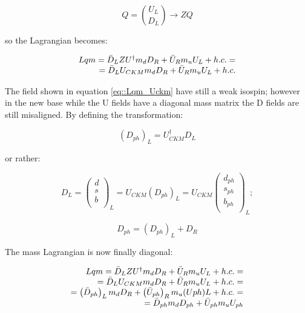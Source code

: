 \begin{equation}
Q = \binom{U_{L}}{D_{L}} \longrightarrow ZQ
\end{equation}

so the Lagrangian becomes:

\begin{equation}
\begin{array}{r c l}
Lqm = \bar{D}_{L}ZU^{\dagger}m_{d}D_{R} + \bar{U}_{R}m_{u}U_{L} + h.c. = \\
= \bar{D}_{L}U_{CKM}m_{d}D_{R} + \bar{U}_{R}m_{u}U_{L} + h.c.
\label{eq::Lqm_Uckm}
\end{array}
\end{equation}

The field shown in equation \ref{eq::Lqm_Uckm} have still a weak isospin; however in the new base while the U fields have a diagonal mass matrix the D fields are still misaligned. By defining the transformation:

\begin{equation}
\left(D_{ph}\right)_{L} = U^{\dagger}_{CKM}D_{L}
\end{equation}

or rather:

\begin{equation}
D_{L} = 
\begin{pmatrix}
d  \\
s  \\
b \\
\end{pmatrix}
_{L} =
U_{CKM}\left(D_{ph}\right)_{L} = U_{CKM}
\begin{pmatrix}
d_{ph}  \\
s_{ph}  \\
b_{ph} \\
\end{pmatrix}
_{L} ;
\end{equation}

\begin{equation}
D_{ph} = \left(D_{ph}\right)_{L} + D_{R}
\end{equation}

The mass Lagrangian is now finally diagonal:

\begin{equation}
\begin{array}{r c l}
Lqm = \bar{D}_{L}ZU^{\dagger}m_{d}D_{R} + \bar{U}_{R}m_{u}U_{L} + h.c. = \\
= \bar{D}_{L}U_{CKM}m_{d}D_{R} + \bar{U}_{R}m_{u}U_{L} + h.c. = \\
=  \left(\bar{D}_{ph}\right)_{L}m_{d}D_{R} + \left(\bar{U}_{ph}\right)_{R}m_{u}(Uph)L + h.c. = \\
= \bar{D}_{ph}m_{d}D_{ph} + \bar{U}_{ph}m_{u}U_{ph}
\label{eq::Lqm_Uckm}
\end{array}
\end{equation}

